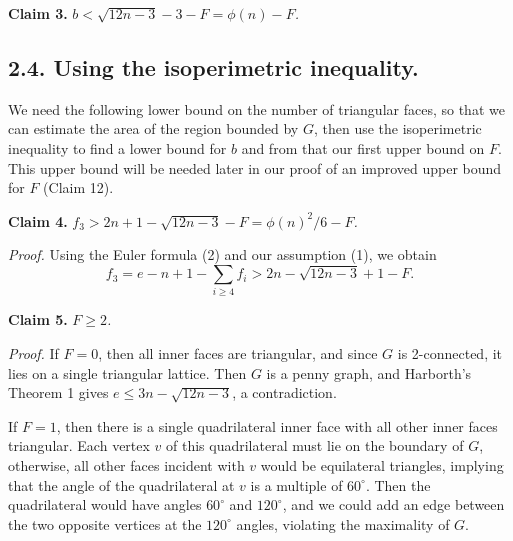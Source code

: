 \documentclass{article}
\begin{document}
\textbf{Claim 3.} $b < \sqrt{12n - 3} - 3 - F = \phi(n) - F$\textit{.}

\subsection*{2.4. Using the isoperimetric inequality.}

We need the following lower bound on the number of triangular faces, so that we can estimate the area of the region bounded by $G$, then use the isoperimetric inequality to find a lower bound for $b$ and from that our first upper bound on $F$. This upper bound will be needed later in our proof of an improved upper bound for $F$ (Claim 12).

\textbf{Claim 4.} $f_{3} > 2n + 1 - \sqrt{12n - 3} - F = \phi(n)^{2}/6 - F$\textit{.}

\textit{Proof.} Using the Euler formula (2) and our assumption (1), we obtain 
\begin{equation*}
f_3 = e - n + 1 - \sum_{i\ge 4} f_i > 2n - \sqrt{12n-3} + 1 - F. \tag*{$\square$}
\end{equation*}

\textbf{Claim 5.} $F \ge 2$\textit{.}

\textit{Proof.} If $F = 0$, then all inner faces are triangular, and since $G$ is 2-connected, it lies on a single triangular lattice. Then $G$ is a penny graph, and Harborth’s Theorem 1 gives $e \le 3n - \sqrt{12n - 3}$, a contradiction.

If $F = 1$, then there is a single quadrilateral inner face with all other inner faces triangular. Each vertex $v$ of this quadrilateral must lie on the boundary of $G$, otherwise, all other faces incident with $v$ would be equilateral triangles, implying that the angle of the quadrilateral at $v$ is a multiple of $60^{\circ}$. Then the quadrilateral would have angles $60^{\circ}$ and $120^{\circ}$, and we could add an edge between the two opposite vertices at the $120^{\circ}$ angles, violating the maximality of $G$.
\end{document}
